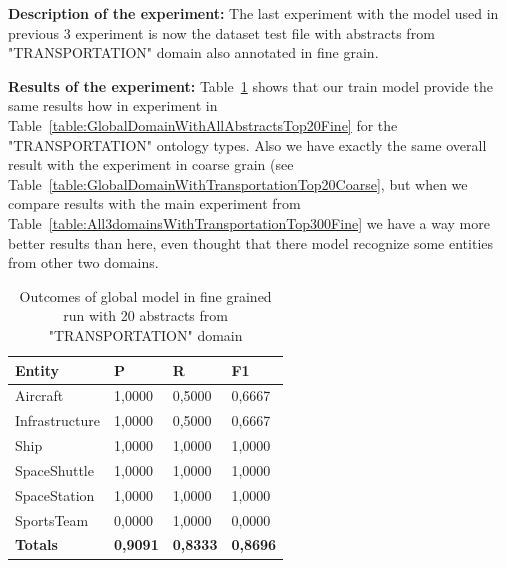 \documentclass[thesis=M,english]{FITthesis}[2018/05/30]
\begin{document}
\textbf{Description of the experiment:} The last experiment with the model used in previous 3 experiment is now the dataset test file with abstracts from "TRANSPORTATION" domain also annotated in fine grain.

\textbf{Results of the experiment:} Table~\ref{table:GlobalDomainWithTransportationTop20Fine} shows that our train model provide the same results how in experiment in Table~\ref{table:GlobalDomainWithAllAbstractsTop20Fine} for the "TRANSPORTATION" ontology types. Also we have exactly the same overall result with the experiment in coarse grain (see Table~\ref{table:GlobalDomainWithTransportationTop20Coarse}, but when we compare results with the main experiment from Table~\ref{table:All3domainsWithTransportationTop300Fine} we have a way more better results than here, even thought that there model recognize some entities from other two domains.

	\begin{table}[H]\centering
		\begin{tabular}{|l|l|l|l|}
			\hline {\textbf{Entity}} & {\textbf{P}} & {\textbf{R}} & {\textbf{F1}}\\\hline
				Aircraft & 1,0000 & 0,5000 & 0,6667\\
				Infrastructure & 1,0000 & 0,5000 & 0,6667\\
				Ship & 1,0000 & 1,0000 & 1,0000\\				
				SpaceShuttle & 1,0000 & 1,0000 & 1,0000\\
				SpaceStation & 1,0000 & 1,0000 & 1,0000\\
				SportsTeam & 0,0000 & 1,0000 & 0,0000\\\hline
				\textbf{Totals} & \textbf{0,9091} & \textbf{0,8333} & \textbf{0,8696}\\\hline
		\end{tabular}
		\caption{Outcomes of global model in fine grained run with 20 abstracts from "TRANSPORTATION" domain \label{table:GlobalDomainWithTransportationTop20Fine}}		
	\end{table}

\end{document}
